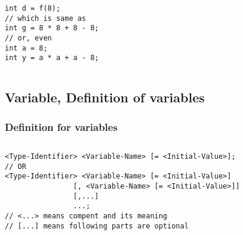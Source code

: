 \documentclass[
  11pt, %
  xcolor=dvipsnames
]{beamer}
\begin{document}
\begin{frame}[fragile]
\begin{columns}[c]
\begin{column}{0.9\textwidth}
\begin{columns}[c]
\begin{column}{0.5\textwidth}
					\begin{lstlisting}[style=Java]
int d = f(8);
// which is same as 
int g = 8 * 8 + 8 - 8;
// or, even
int a = 8;
int y = a * a + a - 8;
          \end{lstlisting}
				\end{column}
			\end{columns}

		\end{column}
	\end{columns}

\end{frame}

\subsection{Variable, Definition of variables}
\begin{frame}[fragile]
	\frametitle{Definition for variables}


	\begin{columns}[c]
		\begin{column}{0.9\textwidth}

			\begin{lstlisting}
<Type-Identifier> <Variable-Name> [= <Initial-Value>];
// OR
<Type-Identifier> <Variable-Name> [= <Initial-Value>]
                [, <Variable-Name> [= <Initial-Value>]]
                [,...]
                ...;
// <...> means compent and its meaning
// [...] means following parts are optional
      \end{lstlisting}


\end{column}
\end{columns}
\end{frame}
\end{document}

